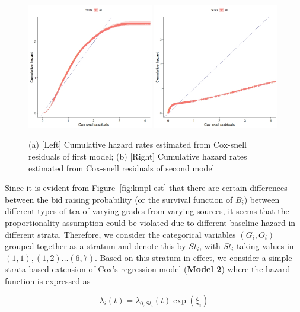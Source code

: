 \documentclass[a4paper,12pt]{article}
\begin{document}
\begin{figure}[htb]
    \centering
    \includegraphics[width = 0.49\textwidth]{figures/coxph-1-resid.jpeg}
    \includegraphics[width = 0.49\textwidth]{figures/coxph-2-resid.jpeg}
    \caption{(a) [Left] Cumulative hazard rates estimated from Cox-snell residuals of first model; (b) [Right] Cumulative hazard rates estimated from Cox-snell residuals of second model}
    \label{fig:coxsnell-resid}
\end{figure}

Since it is evident from Figure~\ref{fig:kmpl-est} that there are certain differences between the bid raising probability (or the survival function of $B_i$) between different types of tea of varying grades from varying sources, it seems that the proportionality assumption could be violated due to different baseline hazard in different strata. Therefore, we consider the categorical variables $(G_i, O_i)$ grouped together as a stratum and denote this by $St_i$, with $St_i$ taking values in $(1, 1), (1, 2) \dots (6, 7)$. Based on this stratum in effect, we consider a simple strata-based extension of Cox's regression model (\textbf{Model 2}) where the hazard function is expressed as

$$
\lambda_i(t) = \lambda_{0,St_i}(t) \exp(\xi_i)
$$
\end{document}

